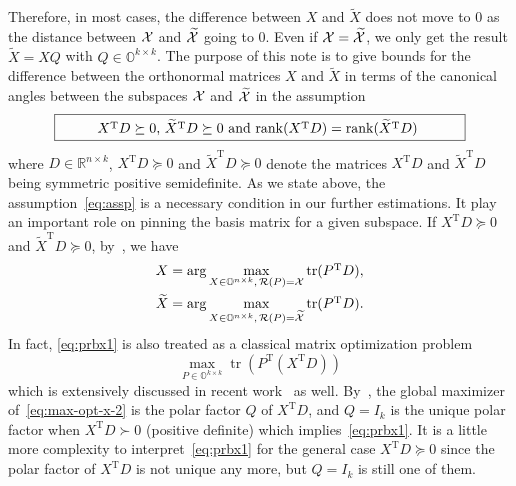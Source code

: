\documentclass[11pt]{article}
\def\bbO{\mathbb{O}}
\def\bbR{\mathbb{R}}
\def\cR{{\cal R}}
\def\cX{{\cal X}}
\DeclareMathOperator{\rank}{rank}
\DeclareMathOperator{\tr}{tr}
\DeclareMathOperator{\T}{T}
\def\wtd{\widetilde}
\theoremstyle{definition}
\numberwithin{equation}{section}
\numberwithin{figure}{section}
\numberwithin{table}{section}
\begin{document}
\iffalse
Therefore, in most cases,
the difference between $X$ and $\wtd X$ does not move to 0 as the distance
between $\cX$ and $\wtd\cX$ going to 0. Even if $\cX=\wtd\cX$, we only get the result $\wtd X=XQ$ with $Q\in\bbO^{k\times k}$.
The purpose of this note is to give bounds for the difference between the orthonormal matrices $X$
and $\wtd X$ in terms of the canonical angles between the subspaces $\cX$ and $\wtd\cX$ in the assumption
\begin{equation}\label{eq:assp}
\framebox{\parbox{10cm}{\centering $X^{\T}D\succeq 0$, $\wtd X^{\T}D\succeq 0$ and $\rank(X^{\T}D)=\rank(\wtd X^{\T}D)$}
}
\end{equation}
where $D\in\bbR^{n\times k}$, $X^{\T}D\succeq 0$ and $\wtd X^{\T}D\succeq 0$ denote the matrices $X^{\T}D$ and $\wtd X^{\T}D$
being symmetric positive semidefinite.  As we state above, the assumption~\eqref{eq:assp} is a necessary condition
in our further estimations.  It play an important role on pinning the basis matrix for a given subspace.
If $X^{\T}D\succeq 0$ and $\wtd X^{\T}D\succeq 0$, by~\cite[Section~3]{wazl:22}, we have
\begin{subequations}\label{eq:prbx}
\begin{align}
\label{eq:prbx1} X&=\arg\max_{X\in\bbO^{n\times k},\,\cR(P)=\cX}\tr(P^{\T}D),\\
\label{eq:prbx2} \wtd X&=\arg\max_{X\in\bbO^{n\times k},\,\cR(P)=\wtd\cX}\tr(P^{\T}D).
\end{align}
\end{subequations}
In fact, \eqref{eq:prbx1} is also treated as a classical matrix optimization problem
\begin{equation}\label{eq:max-opt-x-2}
    \max_{P\in\bbO^{k\times k}}\tr\left(P^{\T}(X^{\T}D)\right)
\end{equation}
which is extensively discussed in recent work~\cite[Lemma~3.1]{luli:22} as well.
By~\cite[Lemma~3.1]{luli:22}, the global maximizer of~\eqref{eq:max-opt-x-2} is the polar factor $Q$ of $X^{\T}D$,
and $Q=I_k$ is the unique polar factor when $X^{\T}D\succ 0$ (positive definite) which implies~\eqref{eq:prbx1}.
It is a little more complexity to interpret~\eqref{eq:prbx1} for the general case $X^{\T}D\succeq 0$
since the polar factor of $X^{\T}D$ is not unique any more, but $Q=I_k$ is still one of them.
\end{document}
